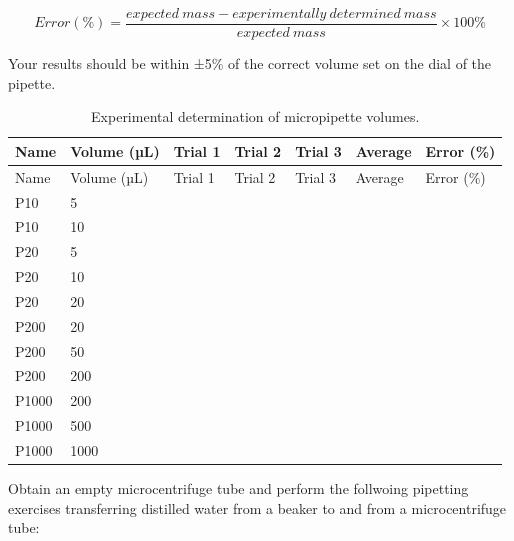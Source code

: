 \documentclass[]{book}
\theoremstyle{definition}
\theoremstyle{definition}
\theoremstyle{definition}
\theoremstyle{remark}
\begin{document}
\[ Error (\%) = \frac{expected\ mass - experimentally\ determined\ mass}{expected\ mass} \times 100\% \]

Your results should be within ±5\% of the correct volume set on the dial
of the pipette.

\begin{longtable}[]{@{}lllllll@{}}
\caption{\label{tab:micro} Experimental determination of micropipette
volumes.}\tabularnewline
\toprule
Name & Volume (µL) & Trial 1 & Trial 2 & Trial 3 & Average & Error
(\%)\tabularnewline
\midrule
\endfirsthead
\toprule
Name & Volume (µL) & Trial 1 & Trial 2 & Trial 3 & Average & Error
(\%)\tabularnewline
\midrule
\endhead
P10 & 5 & & & & &\tabularnewline
P10 & 10 & & & & &\tabularnewline
P20 & 5 & & & & &\tabularnewline
P20 & 10 & & & & &\tabularnewline
P20 & 20 & & & & &\tabularnewline
P200 & 20 & & & & &\tabularnewline
P200 & 50 & & & & &\tabularnewline
P200 & 200 & & & & &\tabularnewline
P1000 & 200 & & & & &\tabularnewline
P1000 & 500 & & & & &\tabularnewline
P1000 & 1000 & & & & &\tabularnewline
\bottomrule
\end{longtable}

Obtain an empty microcentrifuge tube and perform the follwoing pipetting
exercises transferring distilled water from a beaker to and from a
microcentrifuge tube:
\end{document}
